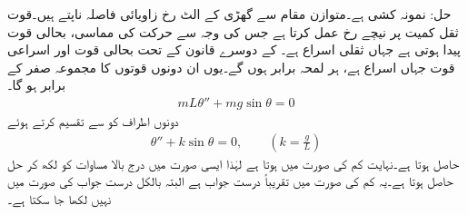 حل:\quad {} نمونہ کشی ہے۔متوازن مقام سے گھڑی کے الٹ رخ زاویائی فاصلہ  ناپتے ہیں۔قوت ثقل  کمیت پر نیچے رخ عمل کرتا ہے جس کی وجہ سے حرکت کی مماسی، بحالی قوت   پیدا ہوتی ہے جہاں  ثقلی اسراع ہے۔ کے دوسرے قانون کے تحت بحالی قوت اور اسراعی  قوت  جہاں  اسراع ہے، ہر لمحہ برابر ہوں گے۔یوں ان دونوں قوتوں کا مجموعہ صفر کے برابر ہو گا۔
\begin{align*}
mL\theta''+mg\sin \theta=0
\end{align*}
دونوں اطراف کو  سے تقسیم کرتے ہوئے
\begin{align}\label{مساوات_نظام_غیر_خطی_ترکیب_مرحلہ_ت}
\theta''+k\sin \theta=0,\quad \quad \left(k=\frac{g}{L}\right)
\end{align}
حاصل ہوتا ہے۔نہایت کم  کی صورت میں  ہوتا ہے لہٰذا ایسی صورت میں درج بالا مساوات کو  لکھ کر حل  حاصل ہوتا ہے۔یہ کم  کی صورت میں تقریباً درست جواب ہے البتہ بالکل درست جواب  کی صورت میں نہیں لکھا جا سکتا ہے۔

